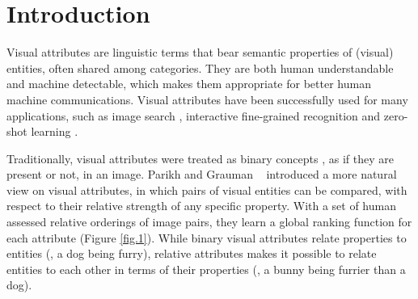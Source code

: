 

\section{Introduction}

 



Visual attributes are linguistic terms that bear semantic properties of (visual) entities, often shared among categories. They are both human understandable and machine detectable, which makes them appropriate for better human machine communications. Visual attributes have been successfully used for many applications, such as image search \cite{whittlesearch}, interactive fine-grained recognition \cite{branson13, branson10} and zero-shot learning \cite{6571196, parikh2011}.

Traditionally, visual attributes were treated as binary concepts \cite{ferrari2007learning, Farhadi09describingobjects}, as if they are present or not, in an image.
Parikh and Grauman ~\cite{parikh2011} introduced a more natural view on visual attributes, in which pairs of visual entities can be compared, with respect to their relative strength of any specific property. With a set of human assessed relative orderings of image pairs, they learn a global ranking function for each attribute (Figure \ref{fig.1}).
While binary visual attributes relate properties to entities (\eg, a dog being furry), relative attributes makes it possible to relate entities to each other in terms of their properties (\eg, a bunny being furrier than a dog).

